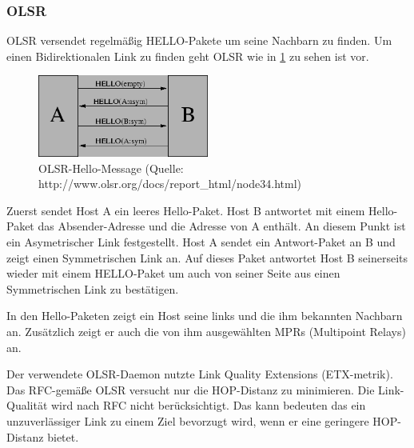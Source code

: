 \documentclass[a4paper,10pt]{article}
\begin{document}

\subsubsection*{OLSR}



OLSR versendet regelmäßig HELLO-Pakete um seine Nachbarn zu finden.
Um einen Bidirektionalen Link zu finden geht OLSR wie in \ref{olsr-hello} zu sehen
ist vor.

\begin{figure}[thb]
 \begin{center}
   \includegraphics[width=0.5\textwidth]{hello-message.png}
    \caption{OLSR-Hello-Message (Quelle: http://www.olsr.org/docs/report_html/node34.html)}
    \label{olsr-hello}
  \end{center}
\end{figure}

Zuerst sendet Host A ein leeres Hello-Paket. Host B antwortet mit einem Hello-Paket das Absender-Adresse
und die Adresse von A enthält. An diesem Punkt ist ein Asymetrischer Link festgestellt.
Host A sendet ein Antwort-Paket an B und zeigt einen Symmetrischen Link an. Auf dieses Paket antwortet Host B seinerseits
wieder mit einem HELLO-Paket um auch von seiner Seite aus einen Symmetrischen Link zu bestätigen.

In den Hello-Paketen zeigt ein Host seine links und die ihm bekannten Nachbarn an. Zusätzlich zeigt er auch die
von ihm ausgewählten MPRs (Multipoint Relays) an.

Der verwendete OLSR-Daemon nutzte Link Quality Extensions (ETX-metrik).
Das RFC-gemäße OLSR versucht nur die HOP-Distanz zu minimieren. Die Link-Qualität
wird nach RFC nicht berücksichtigt. Das kann bedeuten das ein unzuverlässiger Link zu einem Ziel bevorzugt wird,
wenn er eine geringere HOP-Distanz bietet.
\end{document}
